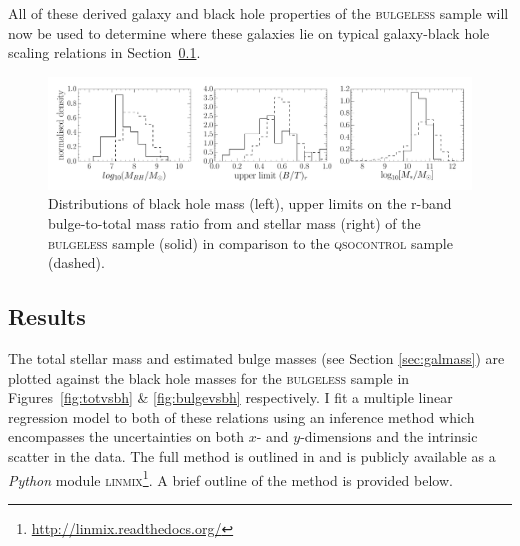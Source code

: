 {All of these derived galaxy and black hole properties of the \textsc{bulgeless} sample will now be used to determine where these galaxies lie on typical galaxy-black hole scaling relations in Section~\ref{sec:intresults}.

\begin{figure}[t]
\centering
\includegraphics[width=\textwidth]{agn/diskdom_mbh_btot_stellar_mass_distributions.pdf}
\caption[Galaxy and black hole properties of the \textsc{bulgeless} sample in comparison to the \textsc{qsocontrol} sample]{Distributions of black hole mass (left), upper limits on the r-band bulge-to-total mass ratio from \citet[][middle]{simard11} and stellar mass (right) of the \textsc{bulgeless} sample (solid) in comparison to the \textsc{qsocontrol} sample (dashed).}
\label{fig:discdomdist}
\end{figure}



%
%  
\subsection{Results}\label{sec:intresults}
%
% 



The total stellar mass and estimated bulge masses (see Section \ref{sec:galmass}) are plotted against the black hole masses for the \textsc{bulgeless} sample in Figures~\ref{fig:totvsbh} \& \ref{fig:bulgevsbh} respectively. I fit a multiple linear regression model to both of these relations using an inference method which encompasses the uncertainties on both $x$- and $y$-dimensions and the intrinsic scatter in the data. The full method is outlined in \citet{kelly07} and is publicly available as a \emph{Python} module \textsc{linmix}\footnote{\url{http://linmix.readthedocs.org/}}. A brief outline of the method is provided below. 

}
